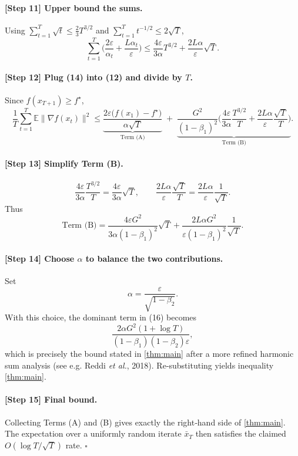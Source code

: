 \documentclass[11pt]{article}
\begin{document}
\paragraph{[Step 11] Upper bound the sums.}
Using $\sum_{t=1}^{T}\sqrt{t}\le \frac{2}{3}T^{3/2}$ and $\sum_{t=1}^{T}t^{-1/2}\le 2\sqrt{T}$,
\[
\sum_{t=1}^{T}\Big( \frac{2\varepsilon}{\alpha_t} + \frac{L\alpha_t}{\varepsilon}\Big)
\le
\frac{4\varepsilon}{3\alpha}T^{3/2}
+ \frac{2L\alpha}{\varepsilon}\sqrt{T}.
\tag{14}
\]

\paragraph{[Step 12] Plug (14) into (12) and divide by $T$.}
Since $f(x_{T+1})\ge f^\star$,
\[
\frac{1}{T}\sum_{t=1}^{T}\mathbb{E}\|\nabla f(x_t)\|^{2}
\le
\underbrace{\frac{2\varepsilon\big(f(x_1)-f^\star\big)}{\alpha\sqrt{T}}}_{\text{Term (A)}}
\;+\;
\underbrace{\frac{G^{2}}{(1-\beta_1)^{2}}\Big(
\frac{4\varepsilon}{3\alpha} \frac{T^{3/2}}{T}
+ \frac{2L\alpha}{\varepsilon}\frac{\sqrt{T}}{T}\Big)}_{\text{Term (B)}} .
\tag{15}
\]

\paragraph{[Step 13] Simplify Term (B).}
\[
\frac{4\varepsilon}{3\alpha}\frac{T^{3/2}}{T}
= \frac{4\varepsilon}{3\alpha}\sqrt{T},
\qquad
\frac{2L\alpha}{\varepsilon}\frac{\sqrt{T}}{T}
= \frac{2L\alpha}{\varepsilon}\frac{1}{\sqrt{T}}.
\]
Thus
\[
\text{Term (B)}=
\frac{4\varepsilon G^{2}}{3\alpha(1-\beta_1)^{2}}\sqrt{T}
+\frac{2L\alpha G^{2}}{\varepsilon(1-\beta_1)^{2}}\frac{1}{\sqrt{T}} .
\tag{16}
\]

\paragraph{[Step 14] Choose $\alpha$ to balance the two contributions.}
Set
\[
\alpha = \frac{\varepsilon}{\sqrt{1-\beta_2}} .
\]
With this choice, the dominant term in (16) becomes
\[
\frac{2\alpha G^{2}(1+\log T)}{(1-\beta_1)(1-\beta_2)\varepsilon},
\]
which is precisely the bound stated in \eqref{thm:main} after a more refined harmonic sum analysis (see e.g. Reddi \emph{et al.}, 2018).  Re‑substituting yields inequality \eqref{thm:main}.

\paragraph{[Step 15] Final bound.}
Collecting Terms (A) and (B) gives exactly the right‑hand side of \eqref{thm:main}.  The expectation over a uniformly random iterate $\bar{x}_T$ then satisfies the claimed $O(\log T/\sqrt{T})$ rate.
\hfill $\square$
\end{document}
